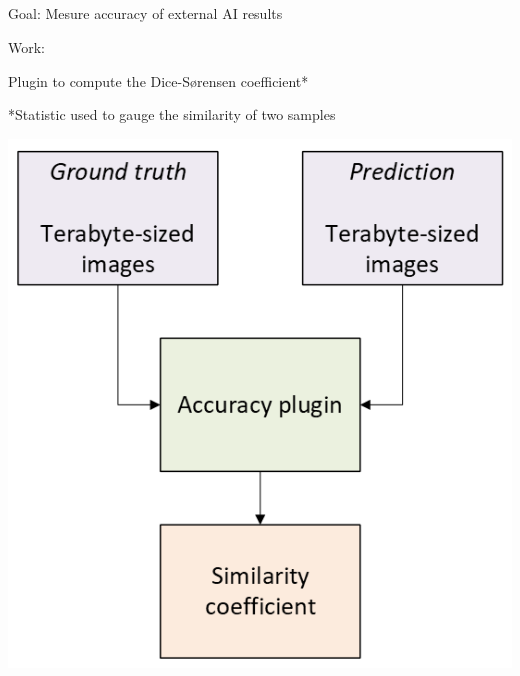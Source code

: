 \subsection{\slidetitle}
\begin{frame}
  \frametitle{\sectiontitle}
  \framesubtitle{\slidetitle}

  \begin{minipage}[h!]{0.65\textwidth}
    Goal: Mesure accuracy of external AI results

    \bigskip

    Work:

    Plugin to compute the Dice-Sørensen coefficient*

    \bigskip
    \bigskip

    *Statistic used to gauge the similarity of two samples
  \end{minipage}\hfill
  \begin{minipage}[h!]{0.35\textwidth}
    \includegraphics[scale=0.55]{./img/2_ai-plugins/accuracy.png}
  \end{minipage}
\end{frame}
